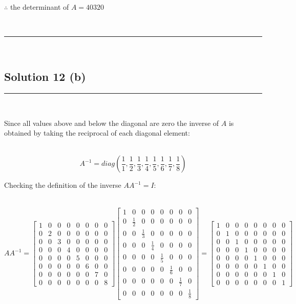 \documentclass{article}
\begin{document}
\parbox{\textwidth}{$\therefore$ the determinant of $A= 40320$}\\

\noindent\rule{\textwidth}{0.4pt}\\
\newpage
\subsection*{Solution 12 (b)}
\noindent\rule{\textwidth}{0.4pt}\\

\parbox{\textwidth}{Since all values above and below the diagonal are zero the inverse of $A$ is obtained by taking the reciprocal of each diagonal element:}\\
$$A^{-1} = diag\left(\frac{1}{1}, \frac{1}{2}, \frac{1}{3}, \frac{1}{4}, \frac{1}{5}, \frac{1}{6}, \frac{1}{7}, \frac{1}{8}\right)$$

\parbox{\textwidth}{Checking the definition of the inverse $AA^{-1}=I$:}\\
$$AA^{-1} = \begin{bmatrix}
    1 & 0 & 0 & 0 & 0 & 0 & 0 & 0 \\
    0 & 2 & 0 & 0 & 0 & 0 & 0 & 0 \\
    0 & 0 & 3 & 0 & 0 & 0 & 0 & 0 \\
    0 & 0 & 0 & 4 & 0 & 0 & 0 & 0 \\
    0 & 0 & 0 & 0 & 5 & 0 & 0 & 0 \\
    0 & 0 & 0 & 0 & 0 & 6 & 0 & 0 \\
    0 & 0 & 0 & 0 & 0 & 0 & 7 & 0 \\
    0 & 0 & 0 & 0 & 0 & 0 & 0 & 8
\end{bmatrix}\begin{bmatrix}
    1 & 0 & 0 & 0 & 0 & 0 & 0 & 0 \\
    0 & \frac{1}{2} & 0 & 0 & 0 & 0 & 0 & 0 \\
    0 & 0 & \frac{1}{3} & 0 & 0 & 0 & 0 & 0 \\
    0 & 0 & 0 & \frac{1}{4} & 0 & 0 & 0 & 0 \\
    0 & 0 & 0 & 0 & \frac{1}{5} & 0 & 0 & 0 \\
    0 & 0 & 0 & 0 & 0 & \frac{1}{6} & 0 & 0 \\
    0 & 0 & 0 & 0 & 0 & 0 & \frac{1}{7} & 0 \\
    0 & 0 & 0 & 0 & 0 & 0 & 0 & \frac{1}{8}
\end{bmatrix} = \begin{bmatrix}
    1 & 0 & 0 & 0 & 0 & 0 & 0 & 0 \\
    0 & 1 & 0 & 0 & 0 & 0 & 0 & 0 \\
    0 & 0 & 1 & 0 & 0 & 0 & 0 & 0 \\
    0 & 0 & 0 & 1 & 0 & 0 & 0 & 0 \\
    0 & 0 & 0 & 0 & 1 & 0 & 0 & 0 \\
    0 & 0 & 0 & 0 & 0 & 1 & 0 & 0 \\
    0 & 0 & 0 & 0 & 0 & 0 & 1 & 0 \\
    0 & 0 & 0 & 0 & 0 & 0 & 0 & 1
\end{bmatrix}$$
\end{document}
